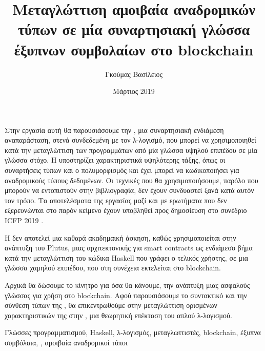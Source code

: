 \documentclass[diploma]{softlab-thesis}
\begin{document}

\frontmatter

\title{Μεταγλώττιση αμοιβαία αναδρομικών τύπων σε μία συναρτησιακή γλώσσα έξυπνων συμβολαίων στο blockchain}
\author{Γκούμας Βασίλειος}
\date{Μάρτιος 2019}




\maketitle



\begin{abstractgr}%
Στην εργασία αυτή θα παρουσιάσουμε την \FIR{}, μια συναρτησιακή ενδιάμεση αναπαράσταση, στενά
συνδεδεμένη με τον λ-λογισμό, που μπορεί να χρησιμοποιηθεί  κατά
την μεταγλώττιση των προγραμμάτων από μία γλώσσα υψηλού επιπέδου σε μία γλώσσα στόχο. Η \FIR{}
υποστηρίζει χαρακτηριστικά υψηλότερης τάξης, όπως οι συναρτήσεις τύπων
και ο πολυμορφισμός και έχει μπορεί να κωδικοποιήσει για αναδρομικούς τύπους δεδομένων. Οι τεχνικές
που θα χρησιμοποιήσουμε, παρόλο που μπορούν να εντοπιστούν στην βιβλιογραφία, δεν έχουν συνδυαστεί
ξανά κατά αυτόν τον τρόπο. Τα αποτελέσματα της εργασίας μαζί και με ερωτήματα που δεν εξερευνώνται
στο παρόν κείμενο έχουν υποβληθεί προς δημοσίευση στο συνέδριο ICFP 2019 .

Η \FIR{} δεν αποτελεί μια καθαρά ακαδημαική άσκηση, καθώς χρησιμοποιείται στην ανάπτυξη του Plutus,
μιας αρχιτεκτονικής για smart contracts ως ενδιάμεσο βήμα κατά την μεταγλώττιση του
κώδικα Haskell που γράφει ο τελικός χρήστης, σε μια γλώσσα χαμηλού επιπέδου, που στη συνέχεια
εκτελείται στο blockchain.

Αρχικά θα δώσουμε το κίνητρο για όσα θα κάνουμε, την ανάπτυξη μιας ασφαλούς γλώσσας για
χρήση στο blockchain.  Αφού παρουσιάσουμε το συντακτικό και την σύνθεση τύπων της \FIR{}, θα επικεντρωθούμε  στην
μεταγλώττιση ορισμένων χαρακτηριστικών της στην \FOMF, μια θεωρητική επέκταση του απλού λ-λογισμού.

\begin{keywordsgr}
Γλώσσες προγραμματισμού, Haskell, λ-λογισμός, μεταγλωττιστές, blockchain, έξυπνα συμβόλαια, \FOM{},
αμοιβαία αναδρομικοί τύποι
\end{keywordsgr}
\end{abstractgr}
\end{document}
